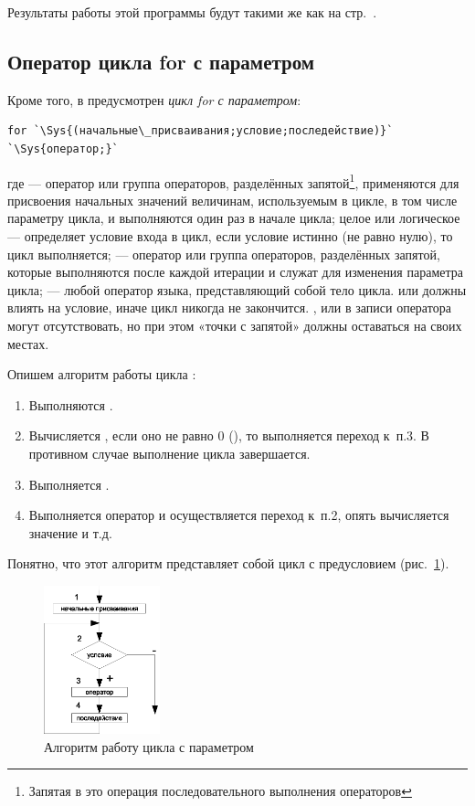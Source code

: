 Результаты работы этой программы будут такими же как на стр.~\pageref{ch03:out0}.%

\subsection[Оператор цикла for с параметром]{Оператор цикла for с параметром}
Кроме того, в  предусмотрен \emph{цикл for с параметром}:
\begin{lstlisting}
for `\Sys{(начальные\_присваивания;условие;последействие)}`
`\Sys{оператор;}`
\end{lstlisting}
где  --- оператор или группа операторов, разделённых
запятой\footnote{Запятая в  это операция последовательного выполнения операторов}, применяются для присвоения
начальных значений величинам, используемым в цикле, в том числе параметру цикла, и выполняются один раз в начале цикла;
целое или логическое  --- определяет условие входа в цикл, если условие истинно (не равно
нулю), то цикл выполняется;  --- оператор или группа операторов, разделённых запятой,
которые выполняются после каждой итерации и служат для изменения параметра цикла;  --- любой
оператор языка, представляющий собой тело цикла.  или 
должны влиять на условие, иначе цикл никогда не закончится. ,
 или  в записи оператора  могут
отсутствовать, но при этом «точки с запятой» должны оставаться на своих местах.

Опишем алгоритм работы цикла :
\begin{enumerate}
\item Выполняются .
\item Вычисляется , если оно не равно 0 (), то выполняется переход к~п.3.
В противном случае выполнение цикла завершается.
\item Выполняется . 
\item Выполняется оператор  и осуществляется переход к~п.2,  опять вычисляется значение
 и т.д.
\end{enumerate}
Понятно, что этот алгоритм представляет собой цикл с предусловием (рис.~\ref{ch03:refDrawing24}).
\begin{figure}[htb]
\begin{center}
\includegraphics[width=0.3\textwidth]{img/ris_3_25}
\caption{Алгоритм работу цикла с параметром}
\label{ch03:refDrawing24}
\end{center}
\end{figure}

